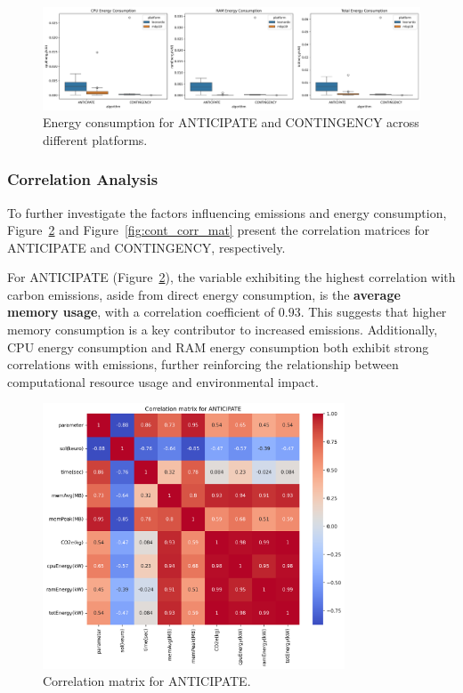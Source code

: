\documentclass[a4paper,singleside,12pt]{report} %
\begin{document}
\begin{figure}[h!]
    \centering
    \includegraphics[width=\textwidth]{imgs/energy_ant_cont.png}
    \caption{Energy consumption for ANTICIPATE and CONTINGENCY across different platforms.}
    \label{fig:ant_cont_energy}
\end{figure}

\subsubsection{Correlation Analysis}

To further investigate the factors influencing emissions and energy consumption, Figure~\ref{fig:ant_corr_mat} and Figure~\ref{fig:cont_corr_mat} present the correlation matrices for ANTICIPATE and 
CONTINGENCY, respectively.

For ANTICIPATE (Figure~\ref{fig:ant_corr_mat}), the variable exhibiting the highest correlation with carbon emissions, aside from direct energy consumption, is the \textbf{average memory usage}, 
with a correlation coefficient of $0.93$. This suggests that higher memory consumption is a key contributor to increased emissions. Additionally, CPU energy consumption and RAM energy consumption 
both exhibit strong correlations with emissions, further reinforcing the relationship between computational resource usage and environmental impact.

\begin{figure}[h!]
    \centering
    \includegraphics[width=0.8\textwidth]{imgs/ant_corr_mat.png}
    \caption{Correlation matrix for ANTICIPATE.}
    \label{fig:ant_corr_mat}
\end{figure}
\end{document}
